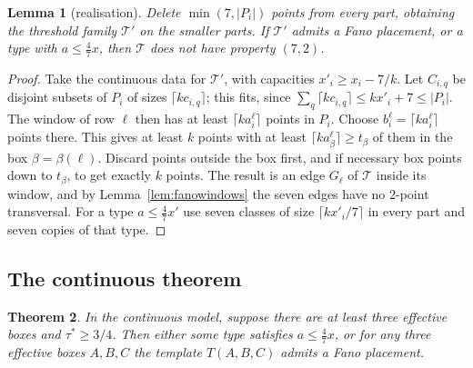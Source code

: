 \documentclass[11pt]{amsart}
\newtheorem{theorem}{Theorem}[section]
\newtheorem{lemma}[theorem]{Lemma}
\theoremstyle{definition}
\theoremstyle{remark}
\begin{document}
\begin{lemma}[realisation]\label{lem:realise}
Delete $\min(7,|P_i|)$ points from every part, obtaining the threshold family $\mathcal T'$ on the smaller parts. If $\mathcal T'$ admits a Fano placement, or a type with $a\le\tfrac47x$, then $\mathcal T$ does not have property $(7,2)$.
\end{lemma}

\begin{proof}
Take the continuous data for $\mathcal T'$, with capacities $x'_i\ge x_i-7/k$. Let $C_{i,q}$ be disjoint subsets of $P_i$ of sizes $\lceil kc_{i,q}\rceil$; this fits, since $\sum_q\lceil kc_{i,q}\rceil\le kx'_i+7\le|P_i|$. The window of row $\ell$ then has at least $\lceil ka^\ell_i\rceil$ points in $P_i$. Choose $b^\ell_i=\lceil ka^\ell_i\rceil$ points there. This gives at least $k$ points with at least $\lceil ka^\ell_{\beta}\rceil\ge t_\beta$ of them in the box $\beta=\beta(\ell)$. Discard points outside the box first, and if necessary box points down to $t_\beta$, to get exactly $k$ points. The result is an edge $G_\ell$ of $\mathcal T$ inside its window, and by Lemma~\ref{lem:fanowindows} the seven edges have no $2$-point transversal. For a type $a\le\frac47x'$ use seven classes of size $\lceil kx'_i/7\rceil$ in every part and seven copies of that type.
\end{proof}

\subsection{The continuous theorem}

\begin{theorem}\label{thm:threshold-cont}
In the continuous model, suppose there are at least three effective boxes and $\tau^*\ge 3/4$. Then either some type satisfies $a\le\frac47x$, or for any three effective boxes $A,B,C$ the template $T(A,B,C)$ admits a Fano placement.
\end{theorem}
\end{document}
